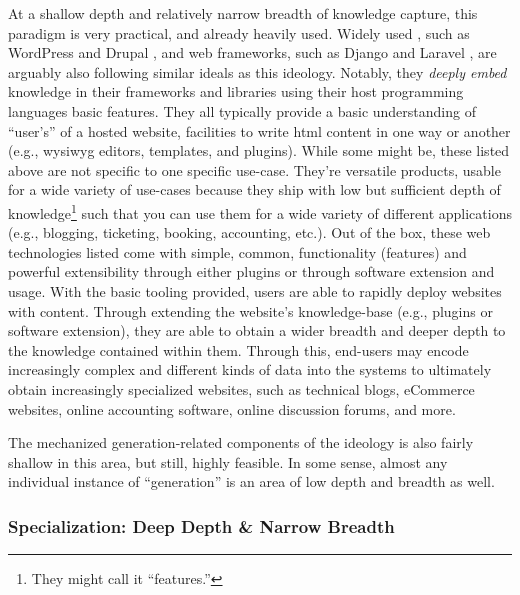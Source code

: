 At a shallow depth and relatively narrow breadth of knowledge capture, this
paradigm is very practical, and already heavily used. Widely used ,
such as WordPress \cite{WordPress} and Drupal \cite{Drupal}, and web frameworks,
such as Django \cite{Django} and Laravel \cite{Laravel}, are arguably also
following similar ideals as this ideology. Notably, they \textit{deeply embed}
\cite{Carette2009} knowledge in their frameworks and libraries using their host
programming languages basic features. They all typically provide a basic
understanding of ``user's'' of a hosted website, facilities to write \acs{html}
content in one way or another (e.g., \acs{wysiwyg} editors, templates, and
plugins). While some might be, these listed above are not specific to one
specific use-case. They're versatile products, usable for a wide variety of
use-cases because they ship with low but sufficient depth of
knowledge\footnote{They might call it ``features.''} such that you can use them
for a wide variety of different applications (e.g., blogging, ticketing,
booking, accounting, etc.). Out of the box, these web technologies listed come
with simple, common, functionality (features) and powerful extensibility through
either plugins or through software extension and usage. With the basic tooling
provided, users are able to rapidly deploy websites with content. Through
extending the website's knowledge-base (e.g., plugins or software extension),
they are able to obtain a wider breadth and deeper depth to the knowledge
contained within them. Through this, end-users may encode increasingly complex
and different kinds of data into the systems to ultimately obtain increasingly
specialized websites, such as technical blogs, eCommerce websites, online
accounting software, online discussion forums, and more.

The mechanized generation-related components of the ideology is also fairly
shallow in this area, but still, highly feasible. In some sense, almost any
individual instance of ``generation'' is an area of low depth and breadth as
well.

\subsubsection{Specialization: Deep Depth \& Narrow Breadth}
\label{chap:ideology:sec:thoughts_of_generation:subsec:feasibility:subsubsec:specialization}

